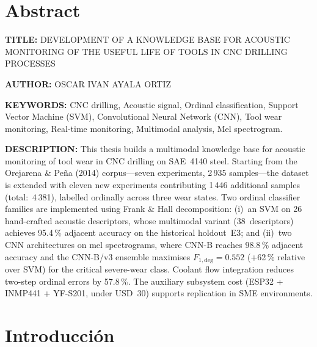 \documentclass[12pt, letterpaper]{report}
\begin{document}
\clearpage
\chapter*{Abstract}

\textbf{TITLE:}\textbf{ }DEVELOPMENT OF A KNOWLEDGE BASE FOR ACOUSTIC MONITORING OF THE USEFUL LIFE OF TOOLS IN CNC DRILLING PROCESSES

\textbf{AUTHOR:  }\textbf{ }OSCAR IVAN AYALA ORTIZ

\textbf{KEYWORDS:} CNC drilling, Acoustic signal, Ordinal classification, Support Vector Machine (SVM), Convolutional Neural Network (CNN), Tool wear monitoring, Real-time monitoring, Multimodal analysis, Mel spectrogram.

\textbf{DESCRIPTION:} This thesis builds a multimodal knowledge base for acoustic monitoring of tool wear in CNC drilling on SAE~4140 steel. Starting from the Orejarena \& Peña (2014) corpus---seven experiments, 2\,935 samples---the dataset is extended with eleven new experiments contributing 1\,446 additional samples (total:~4\,381), labelled ordinally across three wear states. Two ordinal classifier families are implemented using Frank \& Hall decomposition: (i)~an SVM on 26 hand-crafted acoustic descriptors, whose multimodal variant (38~descriptors) achieves 95.4\,\% adjacent accuracy on the historical holdout~E3; and (ii)~two CNN architectures on mel spectrograms, where CNN-B reaches 98.8\,\% adjacent accuracy and the CNN-B/v3 ensemble maximises $F_{1,\text{deg}} = 0.552$ (+62\,\% relative over SVM) for the critical severe-wear class. Coolant flow integration reduces two-step ordinal errors by 57.8\,\%. The auxiliary subsystem cost (ESP32 + INMP441 + YF-S201, under USD~30) supports replication in SME environments.

\clearpage
\chapter*{Introducción}
\end{document}
